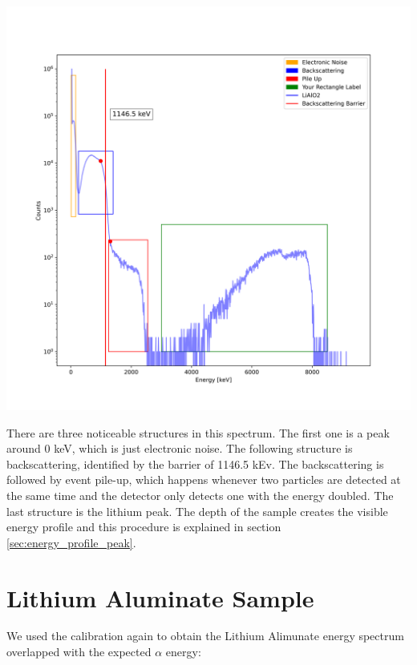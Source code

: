 \documentclass{article}
\begin{document}
\begin{multicols}{2}
\begin{center}
    \label{TT_21}
    \centering
    \includegraphics[scale = 0.4]{../../images/FullAnalysisLiF.png}
\end{center}

There are three noticeable structures in this spectrum. 
The first one is a peak around 0 keV, which is just electronic noise. The following structure is backscattering, identified by the barrier of 1146.5 kEv. 
The backscattering is followed by event pile-up, which happens whenever two particles are detected at the same time and the detector only detects one with the energy doubled.
The last structure is the lithium peak. The depth of the sample creates the visible energy profile and this procedure is explained in section \ref{sec:energy_profile_peak}.


\section{ Lithium Aluminate Sample}

We used the calibration again to obtain the Lithium Alimunate energy spectrum overlapped with the expected $\alpha$ energy:


\end{multicols}
\end{document}
